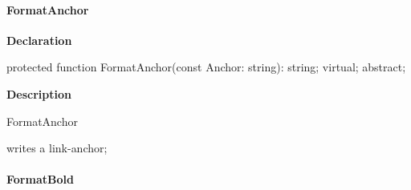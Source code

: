 \documentclass{report}
\newif\ifpdf
\begin{document}
\paragraph*{FormatAnchor}\hspace*{\fill}

\label{PasDoc_Gen.TDocGenerator-FormatAnchor}
\begin{list}{}{
\setlength{\itemindent}{0cm}
\setlength{\listparindent}{0cm}
\setlength{\leftmargin}{\evensidemargin}
\addtolength{\leftmargin}{\tmplength}
\settowidth{\labelsep}{X}
\addtolength{\leftmargin}{\labelsep}
\setlength{\labelwidth}{\tmplength}
}
\item[\textbf{Declaration}\hfill]
\ifpdf
\begin{flushleft}
\fi
\begin{ttfamily}
protected function FormatAnchor(const Anchor: string): string; virtual; abstract;\end{ttfamily}

\ifpdf
\end{flushleft}
\fi

\par
\item[\textbf{Description}]
\begin{ttfamily}FormatAnchor\end{ttfamily} writes a link{-}anchor;

\end{list}
\paragraph*{FormatBold}\hspace*{\fill}
\end{document}

